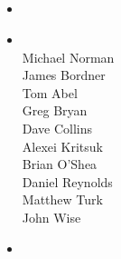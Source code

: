 \NEWSEC

\subsection{\ssSource}

\begin{frame}[fragile,label=ss-source] 
\secframetitle{\ssSource}
\begin{itemize}
\item {}
\item {} \\
\footnotesize
Michael Norman \\
James Bordner \\ 
Tom Abel \\
Greg Bryan \\
Dave Collins \\ 
Alexei Kritsuk \\ 
Brian O'Shea \\
Daniel Reynolds \\ 
Matthew Turk \\ 
John Wise \\
\normalsize
\item {}  \\
\small{}
\end{itemize}
\end{frame}

